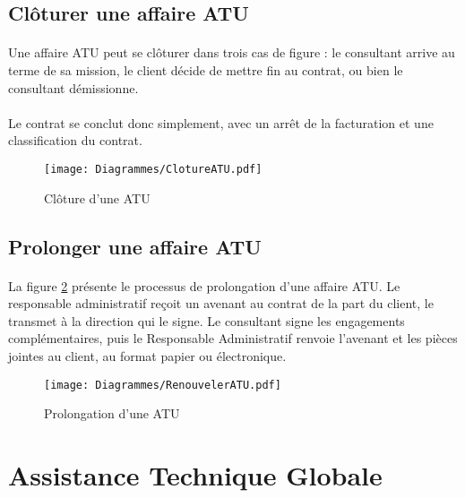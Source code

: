 \subsection{Clôturer une affaire ATU}

\paragraph{} Une affaire ATU peut se clôturer dans trois cas de figure : le consultant arrive au terme de sa mission, le client décide de mettre fin au contrat, ou bien le consultant démissionne.
\paragraph{} Le contrat se conclut donc simplement, avec un arrêt de la facturation et une classification du contrat.

\begin{figure}[H]
	\centering
	\texttt{[image: Diagrammes/ClotureATU.pdf]}
	\caption{Clôture d'une ATU} 
	\label{contractATU}
\end{figure}


\subsection{Prolonger une affaire ATU}

\paragraph{} La figure \ref{prolongerATU} présente le processus de prolongation d'une affaire ATU. Le responsable administratif reçoit un avenant au contrat de la part du client, le transmet à la direction qui le signe. Le consultant signe les engagements complémentaires, puis le Responsable Administratif renvoie l'avenant et les pièces jointes au client, au format papier ou électronique.

\begin{figure}[H]
	\centering
	\texttt{[image: Diagrammes/RenouvelerATU.pdf]}
	\caption{Prolongation d'une ATU} 
	\label{prolongerATU}
\end{figure}

\newpage

\section{Assistance Technique Globale}


